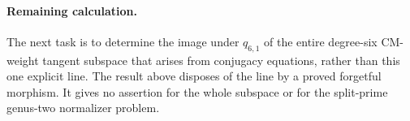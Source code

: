 \paragraph{Remaining calculation.}
The next task is to determine the image under $q_{6,1}$ of
the entire degree-six CM-weight tangent subspace that arises
from conjugacy equations, rather than this one explicit
line. The result above disposes of the line by a proved
forgetful morphism. It gives no assertion for the whole
subspace or for the split-prime genus-two normalizer problem.
